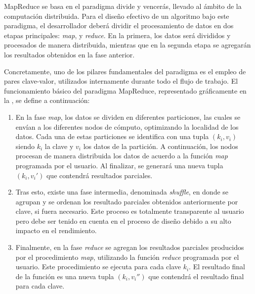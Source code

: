 \documentclass[c5paper,10pt,twoside]{book}	   	%
\begin{document}
MapReduce se basa en el paradigma divide y vencerás, llevado al ámbito de la computación distribuida. Para el diseño efectivo de un algoritmo bajo este paradigma, el desarrollador deberá dividir el procesamiento de datos en dos etapas principales: \textit{map}, y \textit{reduce}. En la primera, los datos será divididos y procesados de manera distribuida, mientras que en la segunda etapa se agregarán los resultados obtenidos en la fase anterior.

Concretamente, uno de los pilares fundamentales del paradigma es el empleo de pares clave-valor, utilizados internamente durante todo el flujo de trabajo. El funcionamiento básico del paradigma MapReduce, representado gráficamente en la , se define a continuación:

\begin{enumerate}
	\item En la fase \textit{map}, los datos se dividen en diferentes particiones, las cuales se envían a los diferentes nodos de cómputo, optimizando la localidad de los datos. Cada una de estas particiones se identifica con una tupla $\left(k_i, v_i\right)$ siendo $k_i$ la clave y $v_i$ los datos de la partición. A continuación, los nodos procesan de manera distribuida los datos de acuerdo a la función \textit{map} programada por el usuario. Al finalizar, se generará una nueva tupla $\left(k_i, v_i'\right)$ que contendrá resultados parciales.
	
	\item Tras esto, existe una fase intermedia, denominada \textit{shuffle}, en donde se agrupan y se ordenan los resultado parciales obtenidos anteriormente por clave, si fuera necesario. Este proceso es totalmente transparente al usuario pero debe ser tenido en cuenta en el proceso de diseño debido a su alto impacto en el rendimiento.
	
	\item Finalmente, en la fase \textit{reduce} se agregan los resultados parciales producidos por el procedimiento \textit{map}, utilizando la función \textit{reduce} programada por el usuario. Este procedimiento se ejecuta para cada clave $k_i$. El resultado final de la función es una nueva tupla $\left(k_i,v_i''\right)$ que contendrá el resultado final para cada clave.
	
\end{enumerate} 
\end{document}
